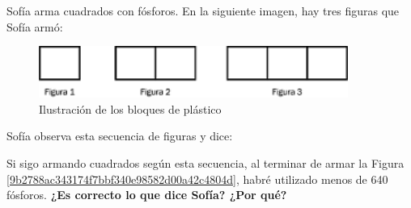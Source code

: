 Sofía arma cuadrados con fósforos. En la siguiente imagen, hay tres figuras que Sofía armó:

\begin{minipage}{0.4\linewidth}
    \begin{figure}[H]
        \centering
        \includegraphics[width=0.9\textwidth]{../images/9b2788ac343174f7bbf340e98582d00a42c4804d}
        \caption{Ilustración de los bloques de plástico}
        \label{fig:9b2788ac343174f7bbf340e98582d00a42c4804d}
    \end{figure}
\end{minipage}\hfill
\begin{minipage}{0.6\linewidth}
    Sofía observa esta secuencia de figuras y dice:

    Si sigo armando cuadrados según esta secuencia, al terminar de armar la Figura \ref{9b2788ac343174f7bbf340e98582d00a42c4804d}, habré utilizado menos de 640 fósforos.
    \textbf{¿Es correcto lo que dice Sofía? ¿Por qué?}
\end{minipage}



